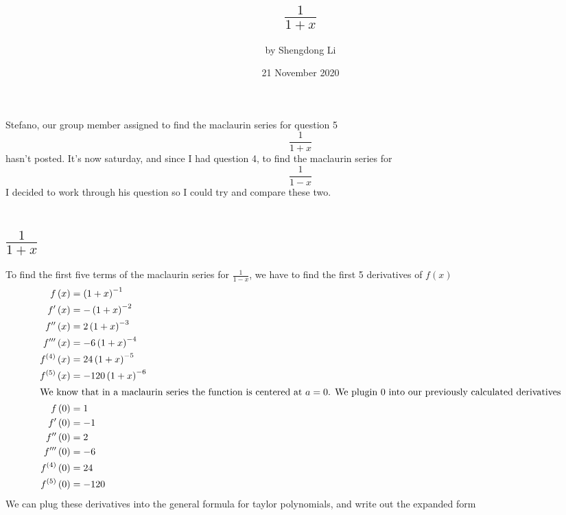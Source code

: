\documentclass[12pt]{article}
\begin{document}
\title{\texorpdfstring{$\frac{1}{1+x}$}{Lg}}
\author{by Shengdong Li}
\date{21 November 2020}
\maketitle

Stefano, our group member assigned to find the maclaurin series for
question 5
$$
  \frac{1}{1+x}
$$
hasn't posted. It's now saturday, and since I had question 4, to find the maclaurin series for
$$
  \frac{1}{1-x}
$$
I decided to work through his question so I could try and compare these two.

\section{\texorpdfstring{$\frac{1}{1+x}$}{Lg}}
To find the first five terms of the maclaurin series for $\frac{1}{1-x}$, we have to find the first 5 derivatives of $f(x)$
\begin{align}
  f\left(x\right)                  & =\left(1+x\right)^{-1}     \\
  f'\left(x\right)                 & =-\left(1+x\right)^{-2}    \\
  f''\left(x\right)                & =2\left(1+x\right)^{-3}    \\
  f'''\left(x\right)               & =-6\left(1+x\right)^{-4}   \\
  f^{\left(4\right)}\left(x\right) & =24\left(1+x\right)^{-5}   \\
  f^{\left(5\right)}\left(x\right) & =-120\left(1+x\right)^{-6} \\
  \intertext{We know that in a maclaurin series the function is centered at $a=0$. We plugin $0$ into our previously calculated derivatives}
  f\left(0\right)                  & =1                         \\
  f'\left(0\right)                 & =-1                        \\
  f''\left(0\right)                & =2                         \\
  f'''\left(0\right)               & =-6                        \\
  f^{\left(4\right)}\left(0\right) & =24                        \\
  f^{\left(5\right)}\left(0\right) & =-120                      \\
\end{align}
We can plug these derivatives into the general formula for taylor polynomials, and write out the expanded form
\end{document}
